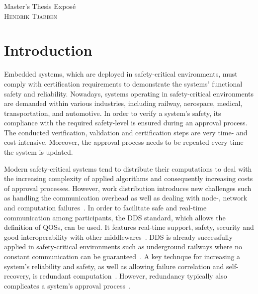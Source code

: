 \documentclass[a4paper, 12pt]{scrartcl}
\begin{document}
\begin{center}
  \Huge{Master's Thesis Expos\'{e}}\\
  \large{\textsc{Hendrik Tjabben}}
\end{center}


\section*{Introduction}
Embedded systems, which are deployed in safety-critical environments, must comply with certification requirements to demonstrate the systems' functional safety and reliability.
Nowadays, systems operating in safety-critical environments are demanded within various industries, including railway, aerospace, medical, transportation, and automotive.
In order to verify a system's safety, its compliance with the required safety-level is ensured during an approval process.
The conducted verification, validation and certification steps are very time- and cost-intensive.
Moreover, the approval process needs to be repeated every time the system is updated.

Modern safety-critical systems tend to distribute their computations to deal with the increasing complexity of applied algorithms and consequently increasing costs of approval processes.
However, work distribution introduces new challenges such as handling the communication overhead as well as dealing with node-, network and computation failures~\cite{DistributedSafety2020}.
In order to facilitate safe and real-time communication among participants, the \gls*{DDS} standard, which allows the definition of \glspl*{QOS}, can be used.
It features real-time support, safety, security and good interoperability with other middlewares~\cite{DistributedSafety2020}.
\gls*{DDS} is already successfully applied in safety-critical environments such as underground railways where no constant communication can be guaranteed~\cite{DDSInURail}.
A key technque for increasing a system's reliability and safety, as well as allowing failure correlation and self-recovery, is redundant computation~\cite{TanenbaumSteen07}.
However, redundancy typically also complicates a system's approval process~\cite{ReliabilityThroughRedundancy}.

\end{document}
